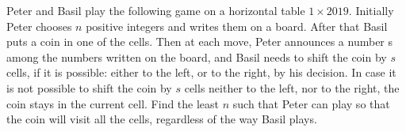 Peter and Basil play the following game on a horizontal table $1\times{2019}$. Initially Peter chooses $n$ positive integers and writes them on a board. After that Basil puts a coin in one of the cells. Then at each move, Peter announces a number s among the numbers written on the board, and Basil needs to shift the coin by $s$ cells, if it is possible: either to the left, or to the right, by his decision. In case it is not possible to shift the coin by $s$ cells neither to the left, nor to the right, the coin stays in the current cell. Find the least $n$ such that Peter can play so that the coin will visit all the cells, regardless of the way Basil plays.